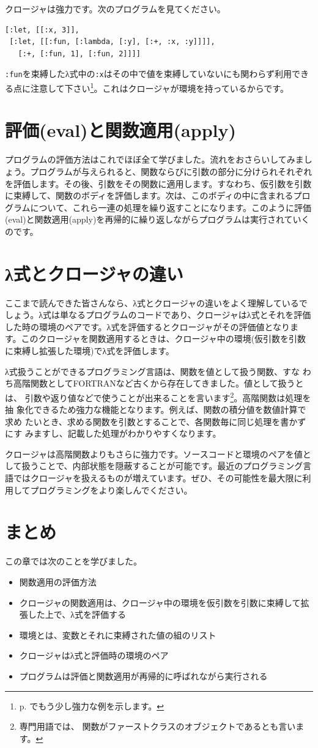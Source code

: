 クロージャは強力です。次のプログラムを見てください。

\begin{lstlisting}
[:let, [[:x, 3]],
 [:let, [[:fun, [:lambda, [:y], [:+, :x, :y]]]],
   [:+, [:fun, 1], [:fun, 2]]]]
\end{lstlisting}

{\tt :fun}を束縛したλ式中の{\tt :x}はその中で値を束縛していないにも関わらず利用できる点に注意して下さい\footnote{p. \pageref{column:closure}でもう少し強力な例を示します。}。これはクロージャが環境を持っているからです。

\section{評価(eval)と関数適用(apply)}

プログラムの評価方法はこれでほぼ全て学びました。流れをおさらいしてみましょう。プログラムが与えられると、関数ならびに引数の部分に分けられそれぞれを評価します。その後、引数をその関数に適用します。すなわち、仮引数を引数に束縛して、関数のボディを評価します。次は、このボディの中に含まれるプログラムについて、これら一連の処理を繰り返すことになります。このように評価(eval)と関数適用(apply)を再帰的に繰り返しながらプログラムは実行されていくのです。


\section{λ式とクロージャの違い}

ここまで読んできた皆さんなら、λ式とクロージャの違いをよく理解しているでしょう。λ式は単なるプログラムのコードであり、クロージャはλ式とそれを評価した時の環境のペアです。λ式を評価するとクロージャがその評価値となります。このクロージャを関数適用するときは、クロージャ中の環境(仮引数を引数に束縛し拡張した環境)でλ式を評価します。

λ式扱うことができるプログラミング言語は、関数を値として扱う関数、すな
わち高階関数としてFORTRANなど古くから存在してきました。値として扱うとは、
引数や返り値などで使うことが出来ることを言います\footnote{専門用語では、
関数がファーストクラスのオブジェクトであるとも言います。}。高階関数は処理を抽
象化できるため強力な機能となります。例えば、関数の積分値を数値計算で求め
たいとき、求める関数を引数とすることで、各関数毎に同じ処理を書かずにす
みますし、記載した処理がわかりやすくなります。

クロージャは高階関数よりもさらに強力です。ソースコードと環境のペアを値として扱うことで、内部状態を隠蔽することが可能です。最近のプログラミング言語ではクロージャを扱えるものが増えています。ぜひ、その可能性を最大限に利用してプログラミングをより楽しんでください。

\section{まとめ}

この章では次のことを学びました。

\begin{itemize}
\item 関数適用の評価方法
\item クロージャの関数適用は、クロージャ中の環境を仮引数を引数に束縛して拡張した上で、λ式を評価する
\item 環境とは、変数とそれに束縛された値の組のリスト
\item クロージャはλ式と評価時の環境のペア
\item プログラムは評価と関数適用が再帰的に呼ばれながら実行される
\end{itemize}


